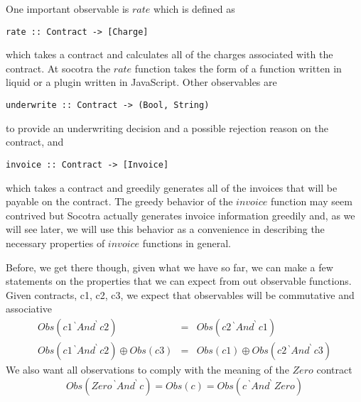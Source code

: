 One important observable is $rate$ which is defined as
\begin{lstlisting}
rate :: Contract -> [Charge]
\end{lstlisting}
which takes a contract and calculates all of the charges associated with the contract. At socotra the $rate$
function takes the form of a function written in liquid or a plugin written in JavaScript. Other observables
are
\begin{lstlisting}
underwrite :: Contract -> (Bool, String)
\end{lstlisting}
to provide an underwriting decision and a possible rejection reason on the contract, and
\begin{lstlisting}
invoice :: Contract -> [Invoice]
\end{lstlisting}
which takes a contract and greedily generates all of the invoices that will be payable on the contract. The
greedy behavior of the $invoice$ function may seem contrived but Socotra actually generates invoice information
greedily and, as we will see later, we will use this behavior as a convenience in describing the necessary properties
of $invoice$ functions in general.

Before, we get there though, given what we have so far, we can make a few statements on the properties that we can
expect from out observable functions. Given contracts, c1, c2, c3, we expect that observables will be commutative and associative
\begin{eqnarray*}
Obs(c1 \, { ^\backprime}An{d^\backprime} \, c2) &  = & Obs(c2 \, { ^\backprime}An{d^\backprime} \, c1) \\
Obs(c1 \, { ^\backprime}An{d^\backprime} \, c2) \oplus Obs(c3) & = & Obs(c1) \oplus Obs(c2 \, { ^\backprime}An{d^\backprime} \, c3)
\end{eqnarray*}
We also want all observations to comply with the meaning of the $Zero$ contract
\begin{equation*}
Obs(Zero \, { ^\backprime}An{d^\backprime} \, c) = Obs(c) = Obs(c \, { ^\backprime}An{d^\backprime} \, Zero)
\end{equation*}

